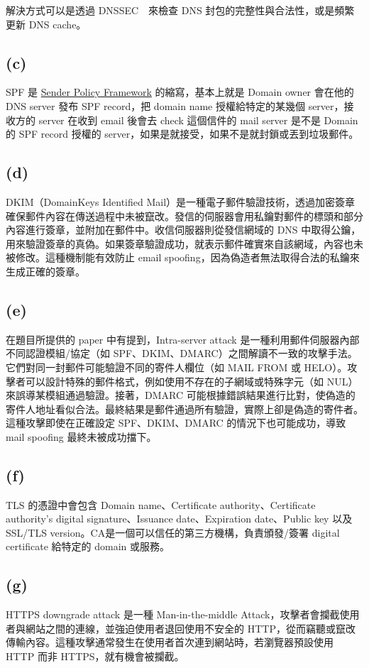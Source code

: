 \documentclass[12pt]{article}
\begin{document}
解決方式可以是透過 DNSSEC　來檢查 DNS 封包的完整性與合法性，或是頻繁更新 DNS cache。
\subsection*{(c)}
SPF 是 \href{https://www.csa.gov.sg/resources/internet-hygiene-portal/information-resources/spf}{Sender Policy Framework} 的縮寫，基本上就是 Domain owner 會在他的 DNS server 發布 SPF record，把 domain name 授權給特定的某幾個 server，接收方的 server 在收到 email 後會去 check 這個信件的 mail server 是不是 Domain 的 SPF record 授權的 server，如果是就接受，如果不是就封鎖或丟到垃圾郵件。
\subsection*{(d)}
DKIM（DomainKeys Identified Mail）是一種電子郵件驗證技術，透過加密簽章確保郵件內容在傳送過程中未被竄改。發信的伺服器會用私鑰對郵件的標頭和部分內容進行簽章，並附加在郵件中。收信伺服器則從發信網域的 DNS 中取得公鑰，用來驗證簽章的真偽。如果簽章驗證成功，就表示郵件確實來自該網域，內容也未被修改。這種機制能有效防止 email spoofing，因為偽造者無法取得合法的私鑰來生成正確的簽章。
\subsection*{(e)}
 在題目所提供的 paper 中有提到，Intra-server attack 是一種利用郵件伺服器內部不同認證模組/協定（如 SPF、DKIM、DMARC）之間解讀不一致的攻擊手法。它們對同一封郵件可能驗證不同的寄件人欄位（如 MAIL FROM 或 HELO）。攻擊者可以設計特殊的郵件格式，例如使用不存在的子網域或特殊字元（如 NUL）來誤導某模組通過驗證。接著，DMARC 可能根據錯誤結果進行比對，使偽造的寄件人地址看似合法。最終結果是郵件通過所有驗證，實際上卻是偽造的寄件者。這種攻擊即使在正確設定 SPF、DKIM、DMARC 的情況下也可能成功，導致 mail spoofing 最終未被成功擋下。
\subsection*{(f)}
TLS 的憑證中會包含 Domain name、Certificate authority、Certificate authority's digital signature、Issuance date、Expiration date、Public key 以及 SSL/TLS version。CA是一個可以信任的第三方機構，負責頒發/簽署 digital certificate 給特定的 domain 或服務。
\subsection*{(g)}
HTTPS downgrade attack 是一種 Man-in-the-middle Attack，攻擊者會攔截使用者與網站之間的連線，並強迫使用者退回使用不安全的 HTTP，從而竊聽或竄改傳輸內容。這種攻擊通常發生在使用者首次連到網站時，若瀏覽器預設使用 HTTP 而非 HTTPS，就有機會被攔截。
\end{document}
